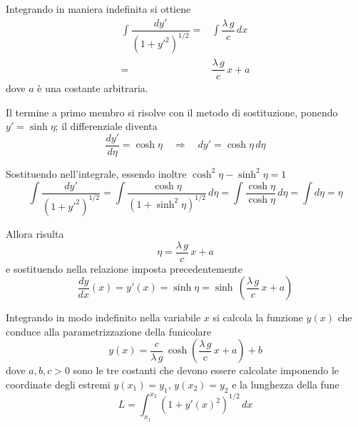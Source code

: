 Integrando in maniera indefinita si ottiene
\begin{align*}
 \int \dfrac{dy'}{\left(1+y'^2\right)^{1/2}} =&\int \dfrac{\lambda\,g}{c}\,dx\\
 =& \dfrac{\lambda\,g}{c}\,x + a
\end{align*}
dove $a$ è una costante arbitraria.

Il termine a primo membro si risolve con il metodo di sostituzione, ponendo $y' = \sinh \eta$; il differenziale diventa
\[
 \dfrac{dy'}{d\eta} = \cosh\eta \quad \Longrightarrow\quad dy' = \cosh\eta\,d\eta
\]

Sostituendo nell'integrale, essendo inoltre $\cosh^2\eta - \sinh^2\eta = 1$
\[
 \int \dfrac{dy'}{\left(1+y'^2\right)^{1/2}} = \int \dfrac{\cosh\eta}{(1+\sinh^2\eta)^{1/2}}\,d\eta = \int \dfrac{\cosh\eta}{\cosh\eta}\,d\eta = \int d\eta = \eta
\]

Allora risulta
\[
\eta = \dfrac{\lambda\,g}{c}\,x + a    
\]
e sostituendo nella relazione imposta precedentemente
\[
\dfrac{dy}{dx}(x) = y'(x) = \sinh \eta = \sinh\,\left(\dfrac{\lambda\,g}{c}\,x + a\right) 
\]

Integrando in modo indefinito nella variabile $x$ si calcola la funzione $y(x)$ che conduce alla parametrizzazione della funicolare
\[
y(x) = \dfrac{c}{\lambda\,g}\,\cosh\left(\dfrac{\lambda\,g}{c}\,x +a\right) + b
\]
dove $a,b,c>0$ sono le tre costanti che devono essere calcolate imponendo le coordinate degli estremi $y(x_1) = y_1$, $y(x_2) = y_2$ e la lunghezza della fune
\[
  L = \int_{x_1}^{x_2} \left(1+y'(x)^2\right)^{1/2}\,dx  
\]










 
 
 
